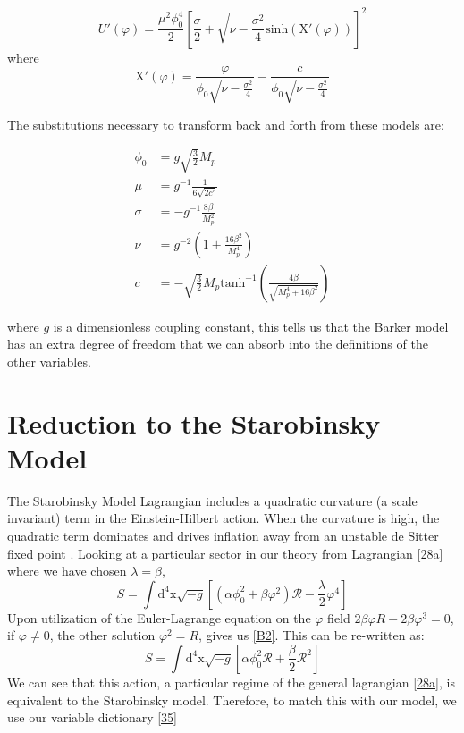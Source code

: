 \documentclass[aps,prd,reprint,preprintnumbers,showpacs,floatfix,nofootinbib,superscript address]{revtex4-2}
\begin{document}
\begin{equation}
    U'(\varphi) = \frac{\mu^2 \phi_{0}^{4}}{2} \left[ \frac{\sigma}{2} + \sqrt{\nu - \frac{\sigma^2}{4}} \text{sinh}\left( \text{X}'(\varphi) \right)  \right]^2
\end{equation}
where
\begin{equation}
    \text{X}'(\varphi) =  \frac{\varphi}{\phi_0 \sqrt{\nu - \frac{\sigma^2}{4}}} - \frac{c}{\phi_0 \sqrt{\nu - \frac{\sigma^2}{4}}}
\end{equation}

The substitutions necessary to transform back and forth from these models are: 

\begin{align}
    \phi_0 &= g \sqrt{\frac{3}{2}} M_p  \nonumber \\
    \mu &= g^{-1} \frac{1}{6 \sqrt{2 c'}}  \nonumber \\
    \sigma &= - g^{-1} \frac{8 \beta}{M_{p}^{2}}  \nonumber \\
    \nu &= g^{-2} \left( 1 + \frac{16 \beta^2}{M_{p}^{4}} \right) \nonumber \\
    c  &= -\sqrt{\frac{3}{2}} M_{p} \text{tanh}^{-1} \left(\frac{4 \beta}{\sqrt{M_{p}^{4}+16 \beta^2}} \right)
\end{align}

where $g$ is a dimensionless coupling constant, this tells us that the Barker model has an extra degree of freedom that we can absorb into the definitions of the other variables.

\section{Reduction to the Starobinsky Model} \label{Appendix B}

The Starobinsky Model Lagrangian includes a quadratic curvature (a scale invariant) term in the Einstein-Hilbert action. When the curvature is high, the quadratic term dominates and drives inflation away from an unstable de Sitter fixed point \cite{Cecchini_2024}. Looking at a particular sector in our theory from Lagrangian \ref{28a} where we have chosen $\lambda = \beta$,
\begin{equation} \label{B1}
    S =\int \text{d}^4\text{x} \sqrt{-g} \left[ (\alpha \phi_0^2 + \beta \varphi^2)\mathcal{R} - \frac{\lambda}{2} \varphi^4 \right]  
\end{equation}
Upon utilization of the Euler-Lagrange equation on the $\varphi$ field $2 \beta \varphi R - 2\beta \varphi^3 = 0$, if $\varphi \neq 0$, the other solution $\varphi^2 = R$, gives us \ref{B2}. This can be re-written as:
\begin{equation} \label{B2}
    S =\int \text{d}^4\text{x} \sqrt{-g} \left[ \alpha \phi_0^2 \mathcal{R} + \frac{\beta}{2} \mathcal{R}^2  \right]
\end{equation}
 We can see that this action, a particular regime of the general lagrangian \ref{28a}, is equivalent to the Starobinsky model. Therefore, to match this with our model, we use our variable dictionary \ref{35}
\end{document}
